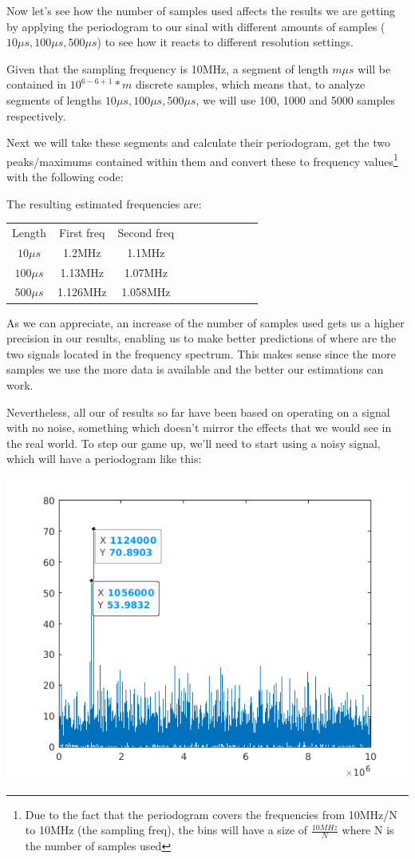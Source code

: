 \documentclass[conference,9pt]{IEEEtran}
\begin{document}
Now let's see how the number of samples used affects the results we are getting by applying the periodogram to our sinal with different amounts of samples ($10\mu s, 100\mu s, 500\mu s$) to see how it reacts to different resolution settings.

Given that the sampling frequency is 10MHz, a segment of length $m \mu s$ will be contained in $10^{6-6+1}*m$ discrete samples, which means that, to analyze segments of lengths $10\mu s, 100\mu s, 500\mu s$, we will use 100, 1000 and 5000 samples respectively.

Next we will take these segments and calculate their periodogram, get the two peaks/maximums contained within them and convert these to frequency values\footnote{Due to the fact that the periodogram covers the frequencies from 10MHz/N to 10MHz (the sampling freq), the bins will have a size of $\frac{10MHz}{N}$ where N is the number of samples used} with the following code:

The resulting estimated frequencies are:
\begin{center}
  \begin{tabular}{ c c c c c c c c c c }
    Length & First freq & Second freq \\
    $10\mu s$ & 1.2MHz & 1.1MHz \\
    $100\mu s$ & 1.13MHz & 1.07MHz \\
    $500\mu s$ & 1.126MHz & 1.058MHz \\ 
  \end{tabular}
\end{center}

As we can appreciate, an increase of the number of samples used gets us a higher precision in our results, enabling us to make better predictions of where are the two signals located in the frequency spectrum. This makes sense since the more samples we use the more data is available and the better our estimations can work.

Nevertheless, all our of results so far have been based on operating on a signal with no noise, something which doesn't mirror the effects that we would see in the real world. To step our game up, we'll need to start using a noisy signal, which will have a periodogram like this:

\includegraphics[scale=0.6]{q5}
\end{document}
